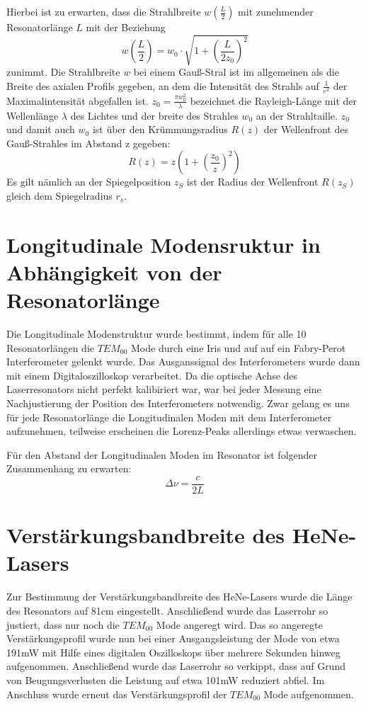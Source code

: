 \documentclass[bigchapter,colorback,accentcolor=tud4b,linedtoc,11pt]{tudreport}
\numberwithin{equation}{subsection}
\begin{document}
Hierbei ist zu erwarten, dass die Strahlbreite $w\left(\frac{L}{2}\right)$ mit zunehmender Resonatorlänge \(L\) mit der Beziehung 
$$w\left(\frac{L}{2}\right)=w_0\cdot\sqrt{1+\left({\frac{L}{2 z_0}}\right)^2}$$
zunimmt. Die Strahlbreite \(w\) bei einem Gauß-Stral ist im allgemeinen als die Breite des axialen Profils gegeben, an dem die Intensität des Strahls auf $\frac{1}{e^2}$ der Maximalintensität abgefallen ist. \(z_0=\frac{\pi w_0^2}{\lambda}\) bezeichnet die Rayleigh-Länge mit der Wellenlänge \(\lambda\) des Lichtes und der breite des Strahles \(w_0\) an der Strahltaille. \(z_0\) und damit auch \(w_0\) ist über den Krümmungsradius $R(z)$ der Wellenfront des Gauß-Strahles im Abstand z gegeben:
$$R(z) = z \left(1+\left(\frac{z_0}{z}\right)^2\right)$$
Es gilt nämlich an der Spiegelposition \(z_S\) ist der Radius der Wellenfront \(R(z_S)\) gleich dem Spiegelradius \(r_s\).


\FloatBarrier
\section{Longitudinale Modensruktur in Abhängigkeit von der Resonatorlänge}
Die Longitudinale Modenstruktur wurde bestimmt, indem für alle 10 Resonatorlängen die $TEM_{00}$ Mode durch eine Iris und auf auf ein Fabry-Perot Interferometer gelenkt wurde. Das Ausganssignal des Interferometers wurde dann mit einem Digitaloszilloskop verarbeitet.
Da die optische Achse des Laserresonators nicht perfekt kalibiriert war, war bei jeder Messung eine Nachjustierung der Position des Interferometers notwendig. Zwar gelang es uns für jede Resonatorlänge die Longitudinalen Moden mit dem Interferometer aufzunehmen, teilweise erscheinen die Lorenz-Peaks allerdings etwas verwaschen.

Für den Abstand der Longitudinalen Moden im Resonator ist folgender Zusammenhang zu erwarten:
$$\Delta\nu=\frac{c}{2L}$$
\FloatBarrier
\newpage
\section{Verstärkungsbandbreite des HeNe-Lasers}
Zur Bestimmung der Verstärkungsbandbreite des HeNe-Lasers wurde die Länge des Resonators auf 81cm eingestellt. Anschließend wurde das Laserrohr so justiert, dass nur noch die $TEM_{00}$ Mode angeregt wird. Das so angeregte Verstärkungsprofil wurde nun bei einer Ausgangsleistung der Mode von etwa 191mW mit Hilfe eines digitalen Oszilloskops über mehrere Sekunden hinweg aufgenommen. Anschließend wurde das Laserrohr so verkippt, dass auf Grund von Beugungsverlusten die Leistung auf etwa 101mW reduziert abfiel. Im Anschluss wurde erneut das Verstärkungsprofil der $TEM_{00}$ Mode aufgenommen.
\end{document}
